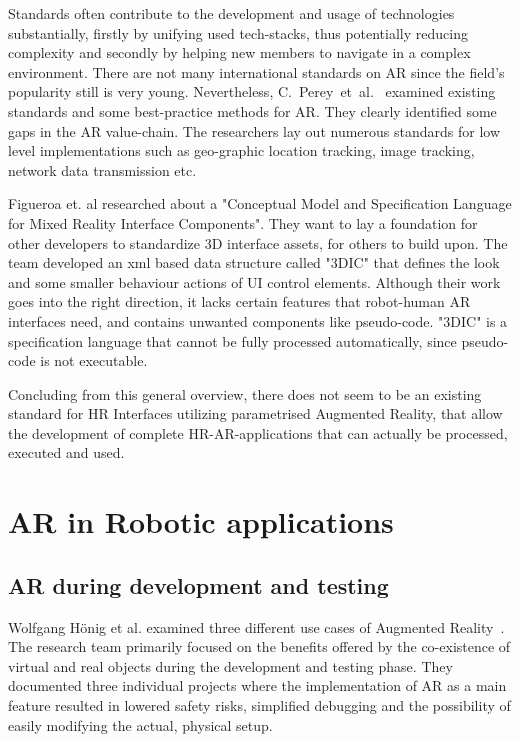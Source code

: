 Standards often contribute to the development and usage of technologies substantially, firstly by unifying used tech-stacks, thus potentially reducing complexity and secondly by helping new members to navigate in a complex environment. There are not many international standards on AR since the field's popularity still is very young. Nevertheless, C.~Perey~et~al.~\cite{perey2011current} examined existing standards and some best-practice methods for AR. They clearly identified some gaps in the AR value-chain. The researchers lay out numerous standards for low level implementations such as geo-graphic location tracking, image tracking, network data transmission etc.

Figueroa et. al \cite{figueroa2006conceptual} researched about a "Conceptual Model and Specification Language for Mixed Reality Interface Components". They want to lay a foundation for other developers to standardize 3D interface assets, for others to build upon. The team developed an xml based data structure called "3DIC" that defines the look and some smaller behaviour actions of UI control elements. Although their work goes into the right direction, it lacks certain features that robot-human AR interfaces need, and contains unwanted components like pseudo-code. "3DIC" is a specification language that cannot be fully processed automatically, since pseudo-code is not executable. 

Concluding from this general overview, there does not seem to be an existing standard for HR Interfaces utilizing parametrised Augmented Reality, that allow the development of complete HR-AR-applications that can actually be processed, executed and used. 

\section{AR in Robotic applications}
\subsection{AR during development and testing}
Wolfgang Hönig et al. examined three different use cases of Augmented Reality~\cite{hoenig2015mixed}. The research team primarily focused on the benefits offered by the co-existence of virtual and real objects during the development and testing phase. They documented three individual projects where the implementation of AR as a main feature resulted in lowered safety risks, simplified debugging and the possibility of easily modifying the actual, physical setup.

